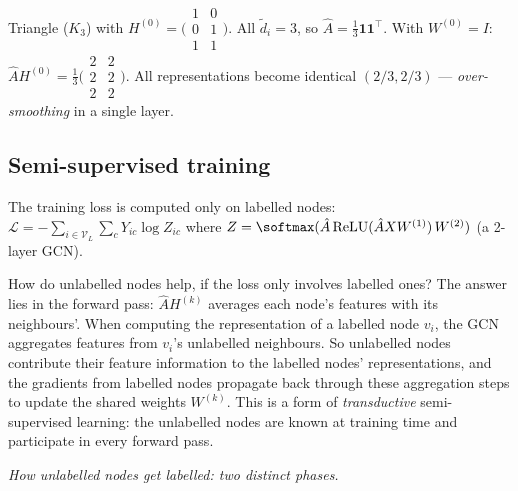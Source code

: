 \begin{notechapter}
\begin{example}
Triangle ($K_3$) with $H^{(0)} = \bigl(\begin{smallmatrix}1&0\\0&1\\1&1
\end{smallmatrix}\bigr)$. All $\tilde{d}_i = 3$, so $\hat{A} = \frac{1}{3}
\mathbf{1}\mathbf{1}^\top$. With $W^{(0)}=I$:
$\hat{A}H^{(0)} = \frac{1}{3}\bigl(\begin{smallmatrix}2&2\\2&2\\2&2
\end{smallmatrix}\bigr)$. All representations become identical
$(2/3,2/3)$ --- \emph{over-smoothing} in a single layer.
\end{example}

\subsection{Semi-supervised training}

The training loss is computed only on labelled nodes:
$\mathcal{L} = -\sum_{i \in \mathcal{V}_L}\sum_c Y_{ic}\log Z_{ic}$
where $Z = \softmax(\hat{A}\,\mathrm{ReLU}(\hat{A}XW^{(1)})\,W^{(2)})$
(a 2-layer GCN).

How do unlabelled nodes help, if the loss only involves labelled ones? The
answer lies in the forward pass: $\hat{A}H^{(k)}$ averages each node's features
with its neighbours'. When computing the representation of a labelled node $v_i$,
the GCN aggregates features from $v_i$'s unlabelled neighbours. So unlabelled
nodes contribute their feature information to the labelled nodes' representations,
and the gradients from labelled nodes propagate back through these aggregation
steps to update the shared weights $W^{(k)}$. This is a form of
\emph{transductive} semi-supervised learning: the unlabelled nodes are known at
training time and participate in every forward pass.

\begin{keyidea}
\emph{How unlabelled nodes get labelled: two distinct phases.}


\end{keyidea}
\end{notechapter}
